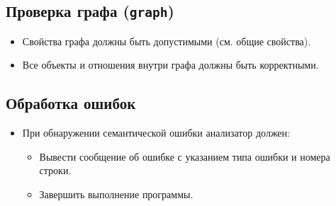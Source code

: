 \documentclass{article}
\begin{document}
\subsection{Проверка графа (\texttt{graph})}
\begin{itemize}
    \item Свойства графа должны быть допустимыми (см. общие свойства).
    \item Все объекты и отношения внутри графа должны быть корректными.
\end{itemize}

\subsection{Обработка ошибок}
\begin{itemize}
    \item При обнаружении семантической ошибки анализатор должен:
    \begin{itemize}
        \item Вывести сообщение об ошибке с указанием типа ошибки и номера строки.
        \item Завершить выполнение программы.
    \end{itemize}
\end{itemize}



\end{document}
